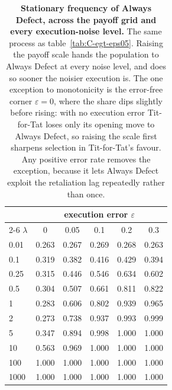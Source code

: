 \documentclass[11pt,a4paper]{article}
\newcommand{\lam}{\lambda}
\begin{document}
\begin{table}[htbp]
\centering
\footnotesize
\caption{\textbf{Stationary frequency of Always Defect, across the payoff grid and every execution-noise level.} The same process as table~\ref{tab:C-egt-eps05}. Raising the payoff scale hands the population to Always Defect at every noise level, and does so sooner the noisier execution is. The one exception to monotonicity is the error-free corner $\varepsilon = 0$, where the share dips slightly before rising: with no execution error Tit-for-Tat loses only its opening move to Always Defect, so raising the scale first sharpens selection in Tit-for-Tat's favour. Any positive error rate removes the exception, because it lets Always Defect exploit the retaliation lag repeatedly rather than once.}
\label{tab:C-egt-alld}
\begin{tabular}{@{}lccccc@{}}
\toprule
& \multicolumn{5}{c}{execution error $\varepsilon$} \\
\cmidrule(lr){2-6}
$\lam$ & 0 & 0.05 & 0.1 & 0.2 & 0.3 \\
\midrule
0.01 & 0.263 & 0.267 & 0.269 & 0.268 & 0.263 \\
0.1 & 0.319 & 0.382 & 0.416 & 0.429 & 0.394 \\
0.25 & 0.315 & 0.446 & 0.546 & 0.634 & 0.602 \\
0.5 & 0.304 & 0.507 & 0.661 & 0.811 & 0.822 \\
1 & 0.283 & 0.606 & 0.802 & 0.939 & 0.965 \\
2 & 0.273 & 0.738 & 0.937 & 0.993 & 0.999 \\
5 & 0.347 & 0.894 & 0.998 & 1.000 & 1.000 \\
10 & 0.563 & 0.969 & 1.000 & 1.000 & 1.000 \\
100 & 1.000 & 1.000 & 1.000 & 1.000 & 1.000 \\
1000 & 1.000 & 1.000 & 1.000 & 1.000 & 1.000 \\
\bottomrule
\end{tabular}
\end{table}
\end{document}

